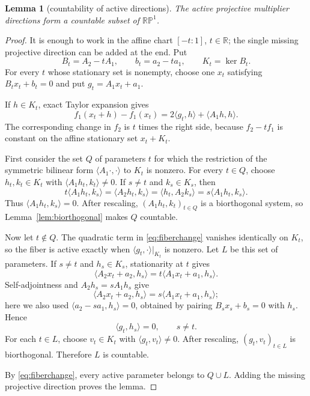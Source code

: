 \documentclass[11pt]{article}
\newtheorem{lemma}[theorem]{Lemma}
\newcommand{\R}{\mathbb R}
\newcommand{\Pj}{\mathbb{RP}^{1}}
\begin{document}
\begin{lemma}[countability of active directions]\label{lem:active}
The active projective multiplier directions form a countable subset of
$\Pj$.
\end{lemma}

\begin{proof}
It is enough to work in the affine chart
$[-t:1]$, $t\in\R$; the single missing projective direction can be added at
the end. Put
\[
 B_t=A_2-tA_1,\qquad b_t=a_2-ta_1,\qquad K_t=\ker B_t.
\]
For every $t$ whose stationary set is nonempty, choose one
$x_t$ satisfying $B_tx_t+b_t=0$ and put
$g_t=A_1x_t+a_1$.

If $h\in K_t$, exact Taylor expansion gives
\begin{equation}\label{eq:fiberchange}
 f_1(x_t+h)-f_1(x_t)
 =2\langle g_t,h\rangle+\langle A_1h,h\rangle.
\end{equation}
The corresponding change in $f_2$ is $t$ times the right side, because
$f_2-tf_1$ is constant on the affine stationary set $x_t+K_t$.

First consider the set $Q$ of parameters $t$ for which the restriction of the
symmetric bilinear form $\langle A_1\cdot,\cdot\rangle$ to $K_t$ is nonzero.
For every $t\in Q$, choose $h_t,k_t\in K_t$ with
$\langle A_1h_t,k_t\rangle\ne0$. If $s\ne t$ and $k_s\in K_s$, then
\[
 t\langle A_1h_t,k_s\rangle
 =\langle A_2h_t,k_s\rangle
 =\langle h_t,A_2k_s\rangle
 =s\langle A_1h_t,k_s\rangle.
\]
Thus $\langle A_1h_t,k_s\rangle=0$. After rescaling,
$(A_1h_t,k_t)_{t\in Q}$ is a biorthogonal system, so
Lemma~\ref{lem:biorthogonal} makes $Q$ countable.

Now let $t\notin Q$. The quadratic term in \eqref{eq:fiberchange} vanishes
identically on $K_t$, so the fiber is active exactly when
$\langle g_t,\cdot\rangle|_{K_t}$ is nonzero. Let $L$ be this set of
parameters. If $s\ne t$ and $h_s\in K_s$, stationarity at $t$ gives
\[
 \langle A_2x_t+a_2,h_s\rangle
 =t\langle A_1x_t+a_1,h_s\rangle.
\]
Self-adjointness and $A_2h_s=sA_1h_s$ give
\[
 \langle A_2x_t+a_2,h_s\rangle
 =s\langle A_1x_t+a_1,h_s\rangle;
\]
here we also used
$\langle a_2-sa_1,h_s\rangle=0$, obtained by pairing
$B_sx_s+b_s=0$ with $h_s$. Hence
\[
 \langle g_t,h_s\rangle=0,\qquad s\ne t.
\]
For each $t\in L$, choose $v_t\in K_t$ with
$\langle g_t,v_t\rangle\ne0$. After rescaling,
$(g_t,v_t)_{t\in L}$ is biorthogonal. Therefore $L$ is countable.

By \eqref{eq:fiberchange}, every active parameter belongs to $Q\cup L$.
Adding the missing projective direction proves the lemma.
\end{proof}
\end{document}
